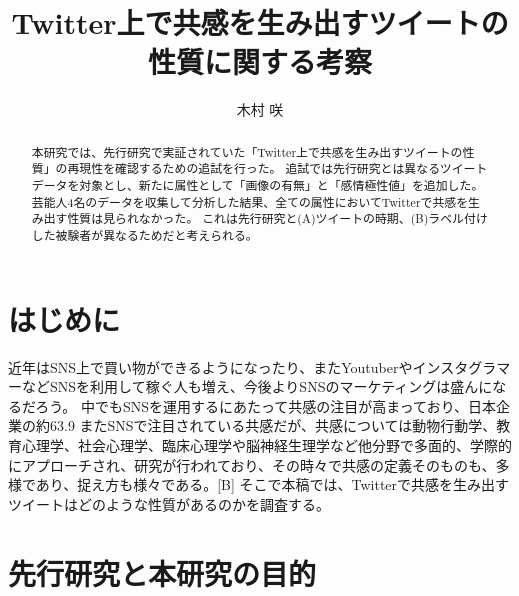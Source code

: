 \documentclass[dvipdfmx]{issj}
\title{Twitter上で共感を生み出すツイートの性質に関する考察}
\author{木村 咲\uddag}
\affiliation{\dag 青山学院大学　社会情報情報学部\ddag }
\begin{document}
\maketitle
\begin{abstract}
本研究では、先行研究で実証されていた「Twitter上で共感を生み出すツイートの性質」の再現性を確認するための追試を行った。 追試では先行研究とは異なるツイートデータを対象とし、新たに属性として「画像の有無」と「感情極性値」を追加した。 芸能人4名のデータを収集して分析した結果、全ての属性においてTwitterで共感を生み出す性質は見られなかった。 これは先行研究と(A)ツイートの時期、(B)ラベル付けした被験者が異なるためだと考えられる。
\end{abstract}
\section{はじめに} %

近年はSNS上で買い物ができるようになったり、またYoutuberやインスタグラマーなどSNSを利用して稼ぐ人も増え、今後よりSNSのマーケティングは盛んになるだろう。
中でもSNSを運用するにあたって共感の注目が高まっており、日本企業の約63.9%
またSNSで注目されている共感だが、共感については動物行動学、教育心理学、社会心理学、臨床心理学や脳神経生理学など他分野で多面的、学際的にアプローチされ、研究が行われており、その時々で共感の定義そのものも、多様であり、捉え方も様々である。[B]
そこで本稿では、Twitterで共感を生み出すツイートはどのような性質があるのかを調査する。





\section{先行研究と本研究の目的}  %
\end{document}
